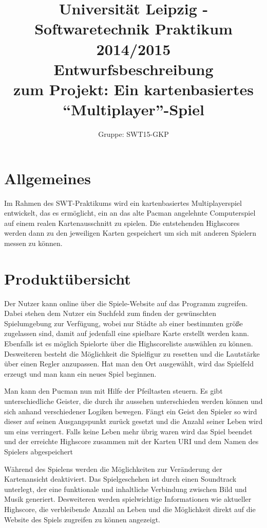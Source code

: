\documentclass[11pt,a4paper]{article}
\author{Gruppe: SWT15-GKP}
\title{Universität Leipzig - Softwaretechnik Praktikum 2014/2015 \\  Entwurfsbeschreibung \\ zum Projekt: Ein kartenbasiertes “Multiplayer”-Spiel}
\begin{document}
\maketitle

\clearpage

\tableofcontents

\clearpage

\flushleft
\section{Allgemeines}
Im Rahmen des SWT-Praktikums wird ein kartenbasiertes Multiplayerspiel entwickelt, das es ermöglicht, ein an das alte Pacman angelehnte Computerspiel auf einem realen Kartenausschnitt zu spielen. Die entstehenden Highscores werden dann zu den jeweiligen Karten gespeichert um sich mit anderen Spielern messen zu können.


\section{Produktübersicht}
Der Nutzer kann online über die Spiele-Website auf das Programm zugreifen.
Dabei stehen dem Nutzer ein Suchfeld zum finden der gewünschten Spielumgebung zur Verfügung, wobei nur Städte ab einer bestimmten größe zugelassen sind, damit auf jedenfall eine spielbare Karte erstellt werden kann. Ebenfalls ist es möglich Spielorte über die Highscoreliste auswählen zu können. Desweiteren besteht die Möglichkeit die Spielfigur zu resetten und die Lautstärke über einen Regler anzupassen.
Hat man den Ort ausgewählt, wird das Spielfeld erzeugt und man kann ein neues Spiel beginnen. 

Man kann den Pucman nun mit Hilfe der Pfeiltasten steuern.
Es gibt unterschiedliche Geister, die durch ihr aussehen unterschieden werden können und sich anhand verschiedener Logiken bewegen. Fängt ein Geist den Spieler so wird dieser auf seinen Ausgangspunkt zurück gesetzt und die Anzahl seiner Leben wird um eins verringert. Falls keine Leben mehr übrig waren wird das Spiel beendet und der erreichte Highscore zusammen mit der Karten URI und dem Namen des Spielers abgespeichert

Während des Spielens werden die Möglichkeiten zur Veränderung der Kartenansicht  deaktiviert. Das Spielgeschehen ist durch einen Soundtrack unterlegt, der eine funktionale und inhaltliche Verbindung zwischen Bild und Musik generiert.
Desweiteren werden spielwichtige Informationen wie aktueller Highscore, die verbleibende Anzahl an Leben und die Möglichkeit direkt auf die Website des Spiels zugreifen zu können angezeigt.
\clearpage
\end{document}
